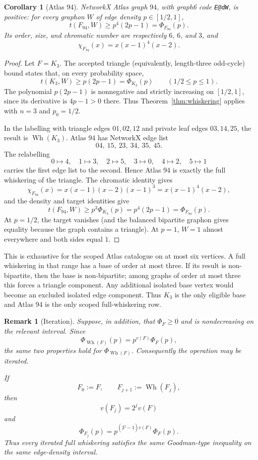 \documentclass[11pt]{article}
\newtheorem{corollary}[theorem]{Corollary}
\newtheorem{remark}[theorem]{Remark}
\begin{document}
\begin{corollary}[Atlas 94]\label{cor:atlas94}
NetworkX Atlas graph $94$, with graph6 code \texttt{E@dW}, is positive:
for every graphon $W$ of edge density $p\in[1/2,1]$,
\[
  t(F_{94},W)\geq p^4(2p-1)=\Phi_{F_{94}}(p).
\]
Its order, size, and chromatic number are respectively $6$, $6$, and $3$,
and
\[
  \chi_{F_{94}}(x)=x(x-1)^4(x-2).
\]
\end{corollary}

\begin{proof}
Let $F=K_3$.  The accepted triangle (equivalently, length-three
odd-cycle) bound states that, on every probability space,
\[
  t(K_3,W)\geq p(2p-1)=\Phi_{K_3}(p)
  \qquad (1/2\leq p\leq1).
\]
The polynomial $p(2p-1)$ is nonnegative and strictly increasing on
$[1/2,1]$, since its derivative is $4p-1>0$ there.  Thus
Theorem~\ref{thm:whiskering} applies with $n=3$ and $p_0=1/2$.

In the labelling with triangle edges $01,02,12$ and private leaf edges
$03,14,25$, the result is $\operatorname{Wh}(K_3)$.  Atlas 94 has
NetworkX edge list
\[
  04,\ 15,\ 23,\ 34,\ 35,\ 45.
\]
The relabelling
\[
  0\mapsto4,\quad 1\mapsto3,\quad 2\mapsto5,\quad
  3\mapsto0,\quad 4\mapsto2,\quad 5\mapsto1
\]
carries the first edge list to the second.  Hence Atlas 94 is exactly
the full whiskering of the triangle.  The chromatic identity gives
\[
  \chi_{F_{94}}(x)
  =x(x-1)(x-2)(x-1)^3
  =x(x-1)^4(x-2),
\]
and the density and target identities give
\[
  t(F_{94},W)\geq p^3\Phi_{K_3}(p)=p^4(2p-1)
  =\Phi_{F_{94}}(p).
\]
At $p=1/2$, the target vanishes (and the balanced bipartite graphon
gives equality because the graph contains a triangle).  At $p=1$,
$W=1$ almost everywhere and both sides equal $1$.
\end{proof}

This is exhaustive for the scoped Atlas catalogue on at most six
vertices.  A full whiskering in that range has a base of order at most
three.  If its result is non-bipartite, then the base is non-bipartite;
among graphs of order at most three this forces a triangle component.
Any additional isolated base vertex would become an excluded isolated
edge component.  Thus $K_3$ is the only eligible base and Atlas 94 is
the only scoped full-whiskering row.

\begin{remark}[Iteration]
Suppose, in addition, that $\Phi_F\ge0$ and is nondecreasing on the
relevant interval. Since
\[
    \Phi_{\operatorname{Wh}(F)}(p)=p^{v(F)}\Phi_F(p),
\]
the same two properties hold for $\Phi_{\operatorname{Wh}(F)}$.
Consequently the operation may be iterated.

If
\[
    F_0:=F,
    \qquad
    F_{j+1}:=\operatorname{Wh}(F_j),
\]
then
\[
    v(F_j)=2^jv(F)
\]
and
\[
    \Phi_{F_j}(p)
    =
    p^{(2^j-1)v(F)}\Phi_F(p).
\]
Thus every iterated full whiskering satisfies the same
Goodman-type inequality on the same edge-density interval.
\end{remark}
\end{document}
